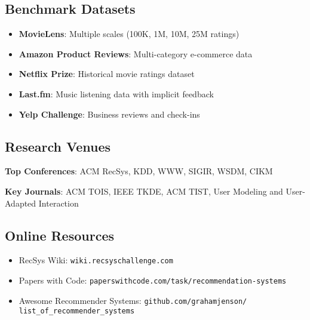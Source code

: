 \subsection{Benchmark Datasets}
\begin{itemize}
    \item \textbf{MovieLens}: Multiple scales (100K, 1M, 10M, 25M ratings)
    \item \textbf{Amazon Product Reviews}: Multi-category e-commerce data
    \item \textbf{Netflix Prize}: Historical movie ratings dataset
    \item \textbf{Last.fm}: Music listening data with implicit feedback
    \item \textbf{Yelp Challenge}: Business reviews and check-ins
\end{itemize}

\subsection{Research Venues}
\textbf{Top Conferences}: ACM RecSys, KDD, WWW, SIGIR, WSDM, CIKM

\textbf{Key Journals}: ACM TOIS, IEEE TKDE, ACM TIST, User Modeling and User-Adapted Interaction

\subsection{Online Resources}
\begin{itemize}
    \item RecSys Wiki: \texttt{wiki.recsyschallenge.com}
    \item Papers with Code: \texttt{paperswithcode.com/task/recommendation-systems}
    \item Awesome Recommender Systems: \texttt{github.com/grahamjenson/}\\\texttt{list\_of\_recommender\_systems}
\end{itemize}
